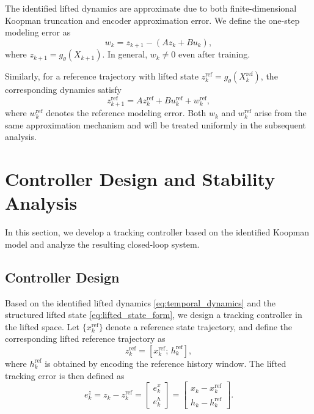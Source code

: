 \documentclass[journal]{IEEEtran}
\begin{document}
The identified lifted dynamics are approximate due to both finite-dimensional Koopman truncation and encoder approximation error. We define the one-step modeling error as
\begin{equation}
    w_k = z_{k+1} - (A z_k + B u_k),
    \label{eq:modeling_error}
\end{equation}
where $z_{k+1} = g_\theta(X_{k+1})$. In general, $w_k \neq 0$ even after training.

Similarly, for a reference trajectory with lifted state $z_k^{\mathrm{ref}} = g_\theta(X_k^{\mathrm{ref}})$, the corresponding dynamics satisfy
\begin{equation}
    z_{k+1}^{\mathrm{ref}} = A z_k^{\mathrm{ref}} + B u_k^{\mathrm{ref}} + w_k^{\mathrm{ref}},
    \label{eq:ref_error}
\end{equation}
where $w_k^{\mathrm{ref}}$ denotes the reference modeling error. Both $w_k$ and $w_k^{\mathrm{ref}}$ arise from the same approximation mechanism and will be treated uniformly in the subsequent analysis.

\section{Controller Design and Stability Analysis}
\label{sec:control}

In this section, we develop a tracking controller based on the identified Koopman model and analyze the resulting closed-loop system.

\subsection{Controller Design}
\label{subsec:controller_design}

Based on the identified lifted dynamics \eqref{eq:temporal_dynamics} and the structured lifted state \eqref{eq:lifted_state_form}, we design a tracking controller in the lifted space. Let $\{x_k^{\mathrm{ref}}\}$ denote a reference state trajectory, and define the corresponding lifted reference trajectory as
\begin{equation}
    z_k^{\mathrm{ref}} = [x_k^{\mathrm{ref}};\,h_k^{\mathrm{ref}}],
    \label{eq:lifted_reference}
\end{equation}
where $h_k^{\mathrm{ref}}$ is obtained by encoding the reference history window. The lifted tracking error is then defined as
\begin{equation}
    e_k^z = z_k - z_k^{\mathrm{ref}}
    =
    \begin{bmatrix}
        e_k^x \\ e_k^h
    \end{bmatrix}
    =
    \begin{bmatrix}
        x_k - x_k^{\mathrm{ref}} \\
        h_k - h_k^{\mathrm{ref}}
    \end{bmatrix}.
    \label{eq:structured_error}
\end{equation}
\end{document}
